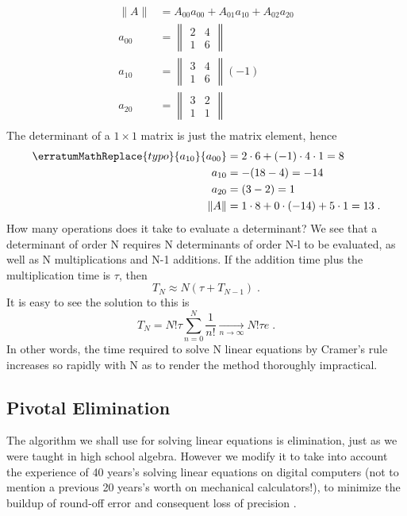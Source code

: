 \begin{align*}
    \lVert A\rVert&=A_{00}a_{00}+A_{01}a_{10}+   A_{02}a_{20}\\
    a_{00} &= 
    \begin{Vmatrix}
        2 & 4\\
        1 & 6
    \end{Vmatrix}\\
    a_{10} &= 
    \begin{Vmatrix}
        3 & 4\\
        1 & 6
    \end{Vmatrix} (-1)\\
    a_{20} &= 
    \begin{Vmatrix}
        3 & 2\\
        1 & 1
    \end{Vmatrix}\\
\end{align*}
The determinant of a $1 \times 1$ matrix is just the matrix element, hence
\begin{align*}
     \erratumMathReplace{typo}{a_{10}}{a_{00}} &=  2 \cdot 6 + (-1)\cdot 4\cdot 1 = 8\\
    a_{10} &=  -(18 - 4) = -14\\
    a_{20} &=  (3 -2) = 1\\
    \lVert A\rVert &= 1\cdot 8 + 0\cdot (-14)+ 5\cdot 1 =13\;.
\end{align*}
\erratumMathPrint%
How many operations does it take to evaluate a determinant? We
see that a determinant of order N requires N determinants of
order N-l to be evaluated, as well as N multiplications and N-1
additions. If the addition time plus the multiplication time is $\tau$,
then
\begin{equation*}
    T_N\approx N(\tau +T_{N-1})\;.
\end{equation*}
It is easy to see the solution to this is
\begin{equation*}
    T_N =N!\tau \sum_{n=0}^{N}\frac{1}{n!} \underset{n\to\infty}{\rightarrow} N!\tau e\;.
\end{equation*}
In other words, the time required to solve N linear equations by
Cramer's rule increases so rapidly with N as to render the method
thoroughly impractical.

\subsection{Pivotal Elimination}
The algorithm we shall use for solving linear equations is elimination, just as we were taught in high school algebra. However we
modify it to take into account the experience of 40 years's solving
linear equations on digital computers (not to mention a previous
20 years's worth on mechanical calculators!), to minimize the
buildup of round-off error and consequent loss of precision .

